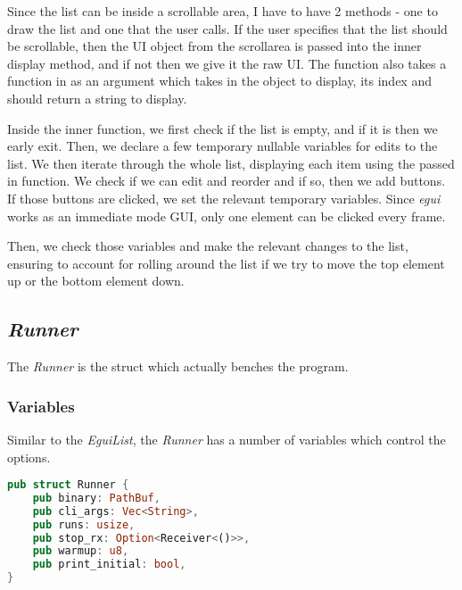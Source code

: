 \documentclass{article}
\begin{document}
Since the list can be inside a scrollable area, I have to have 2 methods - one to draw the list and one that the user calls. If the user specifies that the list should be scrollable, then the UI object from the scrollarea is passed into the inner display method, and if not then we give it the raw UI. The function also takes a function in as an argument which takes in the object to display, its index and should return a string to display.

Inside the inner function, we first check if the list is empty, and if it is then we early exit. Then, we declare a few temporary nullable variables for edits to the list. We then iterate through the whole list, displaying each item using the passed in function. We check if we can edit and reorder and if so, then we add buttons. If those buttons are clicked, we set the relevant temporary variables. Since \textit{egui} works as an immediate mode GUI, only one element can be clicked every frame.

Then, we check those variables and make the relevant changes to the list, ensuring to account for rolling around the list if we try to move the top element up or the bottom element down.


\subsection{\textit{Runner}}
The \textit{Runner} is the struct which actually benches the program.

\subsubsection{Variables}
Similar to the \textit{EguiList}, the \textit{Runner} has a number of variables which control the options.

\begin{lstlisting}[language=Rust]
pub struct Runner {
	pub binary: PathBuf,
	pub cli_args: Vec<String>,
	pub runs: usize,
	pub stop_rx: Option<Receiver<()>>,
	pub warmup: u8,
	pub print_initial: bool,
}
\end{lstlisting}
\end{document}
